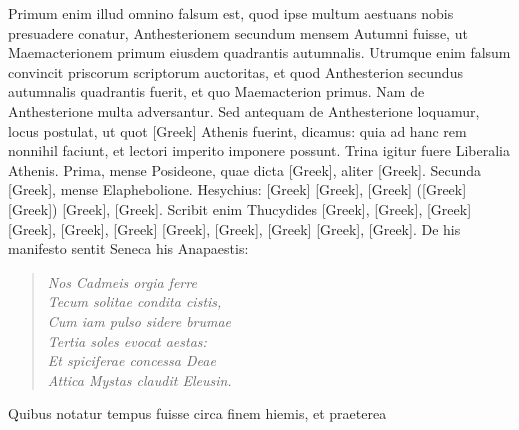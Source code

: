 Primum enim
illud omnino falsum est, quod ipse multum aestuans nobis presuadere
conatur, Anthesterionem secundum mensem Autumni fuisse, ut Maemacterionem
primum eiusdem quadrantis autumnalis.
Utrumque
enim falsum convincit priscorum scriptorum auctoritas, et quod Anthesterion
secundus autumnalis quadrantis fuerit, et quo Maemacterion
primus.
Nam de Anthesterione multa adversantur.
Sed antequam de Anthesterione loquamur, locus postulat, ut quot
 \textgreek{[Greek]}
Athenis fuerint, dicamus: quia ad hanc rem nonnihil faciunt, et lectori
imperito imponere possunt.
Trina igitur fuere Liberalia Athenis.
Prima, mense Posideone, quae dicta \textgreek{[Greek]},
 aliter \textgreek{[Greek]}.
Secunda \textgreek{[Greek]}, mense Elaphebolione.
Hesychius: \textgreek{[Greek]}
\textgreek{[Greek]}, \textgreek{[Greek]} (\textgreek{[Greek]}
\textgreek{[Greek]}) \textgreek{[Greek]}, \textgreek{[Greek]}.
Scribit enim
Thucydides \textgreek{[Greek]}, \textgreek{[Greek]}, \textgreek{[Greek]}
\textgreek{[Greek]}, \textgreek{[Greek]}, \textgreek{[Greek]}
\textgreek{[Greek]}, \textgreek{[Greek]}, \textgreek{[Greek]}
\textgreek{[Greek]}, \textgreek{[Greek]}.
De his manifesto sentit Seneca his Anapaestis:
\begin{verse}
  \emph{Nos Cadmeis orgia ferre\\
  Tecum solitae condita cistis,\\
  Cum iam pulso sidere brumae\\
  Tertia soles evocat aestas:\\
  Et spiciferae concessa Deae\\
  Attica Mystas claudit Eleusin.}
\end{verse}
Quibus notatur tempus fuisse circa finem hiemis, et praeterea
